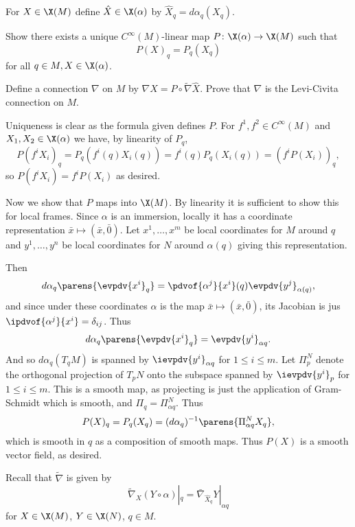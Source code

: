     For $X\in\X(M)$ define $\hat X\in\X(\alpha)$ by $\hat X_q=d\alpha_q(X_q)$.
    \benum
        \item Show there exists a unique $C^\infty(M)$-linear map $P\colon\X(\alpha)\to\X(M)$ such that
        $$ P(X)_q = P_q(X_q) $$
        for all $q\in M,X\in\X(\alpha)$.
        \item Define a connection $\nabla$ on $M$ by $\nabla X=P\circ\tilde\nabla\hat X$.
        Prove that $\nabla$ is the Levi-Civita connection on $M$.
    \eenum

\eprob

\benum
    \item Uniqueness is clear as the formula given defines $P$.
    For $f^1,f^2\in C^\infty(M)$ and $X_1,X_2\in\X(\alpha)$ we have, by linearity of $P_q$,
    $$ P(f^iX_i)_q = P_q(f^i(q)X_i(q)) = f^i(q)P_q(X_i(q)) = (f^iP(X_i))_q , $$
    so $P(f^iX_i)=f^iP(X_i)$ as desired.

    Now we show that $P$ maps into $\X(M)$.
    By linearity it is sufficient to show this for local frames.
    Since $\alpha$ is an immersion, locally it has a coordinate representation $\bar x\mapsto(\bar x,\bar0)$.
    Let $x^1,\dots,x^m$ be local coordinates for $M$ around $q$ and $y^1,\dots,y^n$ be local coordinates for $N$
    around $\alpha(q)$ giving this representation.

    Then
    $$ d\alpha_q\parens{\evpdv{x^i}_q} = \pdvof{\alpha^j}{x^i}(q)\evpdv{y^j}_{\alpha(q)} , $$
    and since under these coordinates $\alpha$ is the map $\bar x\mapsto(\bar x,\bar0)$, its Jacobian is jus
    $\ipdvof{\alpha^j}{x^i}=\delta_{ij}$.
    Thus
    $$ d\alpha_q\parens{\evpdv{x^i}_q} = \evpdv{y^i}_{\alpha q} . $$
    And so $d\alpha_q(T_qM)$ is spanned by $\ievpdv{y^i}_{\alpha q}$ for $1\leq i\leq m$.
    Let $\Pi^N_p$ denote the orthogonal projection of $T_pN$ onto the subspace spanned by $\ievpdv{y^i}_p$ for $1\leq i\leq m$.
    This is a smooth map, as projecting is just the application of Gram-Schmidt which is smooth, and $\Pi_q=\Pi^N_{\alpha q}$.
    Thus
    $$ P(X)_q = P_q(X_q) = (d\alpha_q)^{-1}\parens{\Pi^N_{\alpha q}X_q} , $$
    which is smooth in $q$ as a composition of smooth maps.
    Thus $P(X)$ is a smooth vector field, as desired.

    \item Recall that $\tilde\nabla$ is given by
    $$ \tilde\nabla_X(Y\circ\alpha)|_q = \bar\nabla_{\hat X_q}Y|_{\alpha q} $$
    for $X\in\X(M)$, $Y\in\X(N)$, $q\in M$.

